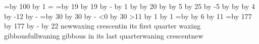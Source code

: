 {	\fi				%
      \fi				%
    \fi					%
  \fi					%
  \cent=\year \divide\cent by 100 \advance\cent by 1
  \golden=\year
  \m=\year \divide\m by 19 \multiply\m by 19 \advance\golden by -\m
  \advance\golden by 1
   \multiply\epact by \golden
  \advance\epact by 20
   \multiply\x by \cent \advance\x by 5
  \divide\x by 25 \advance\x by -5
  \advance\epact by \x
   \multiply\x by \cent \divide\x by 4 \advance\x by -12
  \advance\epact by -\x
  \m=\epact \divide\m by 30 \multiply\m by 30 \advance\epact by -\m
  \ifnum \epact<0
    \advance\epact by 30
  \fi
  \ifnum {}
    \ifnum \golden>11
      \advance \epact by 1
    \fi
  \else
    \ifnum {}
      \advance \epact by 1
    \fi
  \fi
%
%
  \x=\diy \advance\x by \epact \multiply\x by 6 \advance\x by 11
  \m=\x \divide\m by 177 \multiply\m by 177 \advance\x by -\m
  \divide\x by 22
  \ifcase\x new\or waxing crescent\or in its first quarter\or
	waxing gibbous\or full\or waning gibbous\or
	in its last quarter\or waning crescent\or new\fi
}
